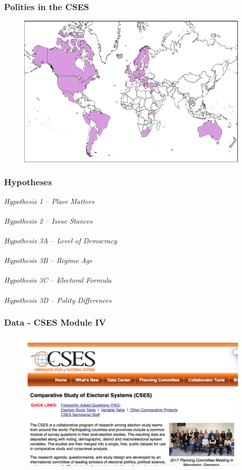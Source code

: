 \documentclass[20pt]{beamer}
\newcommand\e{\emph}
\begin{document}
\begin{frame}
\frametitle{Polities in the CSES}
\begin{figure}[H]    \centering
	{	 \includegraphics[width=.9\textwidth]{Mod4}}
\end{figure}
\end{frame}

\begingroup
\begin{frame}
\footnotesize
\frametitle{Hypotheses}
\e {Hypothesis 1 -- Place Matters} \\
~~\\
\e{Hypothesis 2 -- Issue Stances} \\
~~\\
\e{Hypothesis 3A -- Level of Democracy} \\
~~\\
\e{Hypothesis 3B -- Regime Age} \\
~~\\
\e{Hypothesis 3C -- Electoral Formula}\\
~~\\
\e{Hypothesis 3D -- Polity Differences} 

\end{frame}

\begin{frame}
\frametitle{Data - CSES Module IV}
\begin{figure}[H]    \centering
	{	 \includegraphics[width=.9\textwidth]{CSES}}
\end{figure}
\end{frame}
\end{document}

